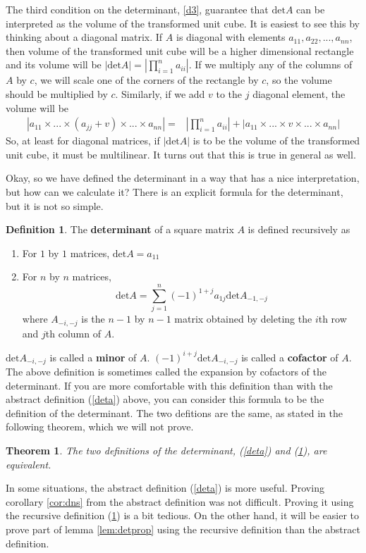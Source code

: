 \documentclass[12pt,reqno]{amsart}
\renewcommand{\det}{\mathrm{det}}
\newtheorem{theorem}{Theorem}[section]
\theoremstyle{definition}
\newtheorem{definition}{Definition}[section]
\begin{document}
The third condition on the determinant, \ref{d3}, guarantee that $\det
A$ can be interpreted as the volume of the transformed unit cube. It
is easiest to see this by thinking about a diagonal matrix. If $A$ is
diagonal with elements $a_{11}, a_{22}, ..., a_{nn}$, then volume of
the transformed unit cube will be a higher dimensional rectangle and
its volume will be $|\det A| = |\prod_{i=1}^n a_{ii} |$. If we
multiply any of the columns of $A$ by $c$, we will scale one of the
corners of the rectangle by $c$, so the volume should be multiplied by
$c$. Similarly, if we add $v$ to the $j$ diagonal element, the
volume will be 
\begin{align*}
  |a_{11}\times ...\times (a_{jj}+v)\times ... \times a_{nn} | = &
  |\prod_{i=1}^n a_{ii} | +  |a_{11}\times ...\times v \times
  ... \times a_{nn} | 
\end{align*}
So, at least for diagonal matrices, if $|\det A| $ is to be the volume
of the transformed unit cube, it must be multilinear. It turns out
that this is true in general as well.

Okay, so we have defined the determinant in a way that has a nice
interpretation, but how can we calculate it? There is an explicit
formula for the determinant, but it is not so simple.  
\begin{definition}\label{detc}
  The \textbf{determinant} of a square matrix $A$ is defined
  recursively as
  \begin{enumerate}
  \item For $1$ by $1$ matrices, $\det A = a_{11}$
  \item For $n$ by $n$ matrices, 
    \[ \det A = \sum_{j=1}^n (-1)^{1+j} a_{1j} \det A_{-1,-j} \]
    where $A_{-i,-j}$ is the $n-1$ by $n-1$ matrix obtained by
    deleting the $i$th row and $j$th column of $A$.
  \end{enumerate}
\end{definition}
$\det A_{-i,-j}$ is called a \textbf{minor} of $A$. $(-1)^{i+j}\det
A_{-i,-j}$ is called a \textbf{cofactor} of $A$. The above definition
is sometimes called the expansion by cofactors of the determinant. If
you are more comfortable with this definition than with the abstract
definition (\ref{deta}) above, you can consider this formula to be the
definition of the determinant. The two defitions are the same, as
stated in the following theorem, which we will not prove.
\begin{theorem}
  The two definitions of the determinant, (\ref{deta}) and
  (\ref{detc}), are equivalent.
\end{theorem}
In some situations, the abstract definition (\ref{deta}) is more
useful. Proving corollary \ref{cor:dns} from the abstract definition
was not difficult. Proving it using the recursive definition
(\ref{detc}) is a bit tedious. On the other hand, it will be easier to
prove part of lemma \ref{lem:detprop} using the recursive definition
than the abstract definition.
\end{document}

